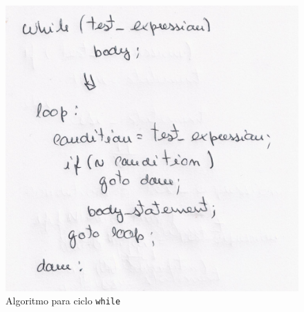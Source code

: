 \begin{figure}[htpb]
	\centering
	\includegraphics[scale=0.75]{./report/img/while.png}
	\caption{Algoritmo para ciclo \texttt{while}}
\label{fig:figure1}
\end{figure}
